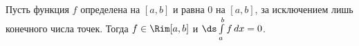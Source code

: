 
 	Пусть функция $f$ определена на $[a,b]$ и равна $0$ на $[a,b]$, за исключением лишь конечного числа точек.
 	Тогда $f\in\Rim[a,b]$ и $\ds\int\limits_a^bf\,dx=0$.
 